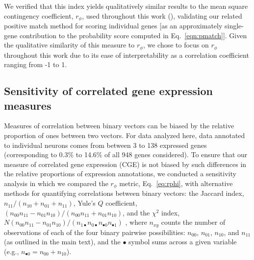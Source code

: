 \documentclass[10pt,letterpaper]{article}
\begin{document}
{We verified that this index yields qualitatively similar results to the mean square contingency coefficient, $r_\phi$, used throughout this work (), validating our related positive match method for scoring individual genes [as an approximately single-gene contribution to the probability score computed in Eq.~\eqref{eqn:pmatch}].
Given the qualitative similarity of this measure to $r_\phi$, we chose to focus on $r_\phi$ throughout this work due to its ease of interpretability as a correlation coefficient ranging from -1 to 1.

\subsection*{Sensitivity of correlated gene expression measures}

Measures of correlation between binary vectors can be biased by the relative proportion of ones between two vectors.
For data analyzed here, data annotated to individual neurons comes from between 3 to 138 expressed genes (corresponding to 0.3\% to 14.6\% of all 948 genes considered).
To ensure that our measure of correlated gene expression (CGE) is not biased by such differences in the relative proportions of expression annotations, we conducted a sensitivity analysis in which we compared the $r_\phi$ metric, Eq.~\eqref{eq:rphi}, with alternative methods for quantifying correlations between binary vectors: the
Jaccard index, $n_{11}/(n_{10} + n_{01} + n_{11})$,
Yule's $Q$ coefficient, $(n_{00}n_{11} - n_{01}n_{10})/(n_{00}n_{11} + n_{01}n_{10})$,
and the $\chi^2$ index, $N (n_{00}n_{11} - n_{01}n_{10})/(n_{1\bullet}n_{0\bullet}n_{\bullet 0}n_{\bullet 1})$ \cite{Kaufman2006}, where $n_{xy}$ counts the number of observations of each of the four binary pairwise possibilities: $n_{00}$, $n_{01}$, $n_{10}$, and $n_{11}$ (as outlined in the main text), and the $\bullet$ symbol sums across a given variable (e.g., $n_{\bullet 0} = n_{00} + n_{10}$).

}
\end{document}
